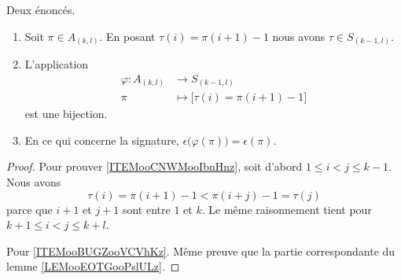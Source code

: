 \begin{lemma}		\label{LEMooCKJAooBIAyVs}
	Deux énoncés.
	\begin{enumerate}
		\item		\label{ITEMooCNWMooIbnHnz}
		      Soit \( \pi\in A_{(k,l)}\). En posant \( \tau(i)=\pi(i+1)-1\) nous avons \( \tau\in S_{(k-1,l)}\).
		\item		\label{ITEMooKNKRooWbLYrF}
		      L'application
		      \begin{equation}
			      \begin{aligned}
				      \varphi\colon A_{(k,l)} & \to S_{(k-1,l)}                          \\
				      \pi                     & \mapsto \Big[  \tau(i)=\pi(i+1)-1  \Big]
			      \end{aligned}
		      \end{equation}
		      est une bijection.
		\item
		      En ce qui concerne la signature, \( \epsilon\big( \varphi(\pi) \big)=\epsilon(\pi)\).
	\end{enumerate}
\end{lemma}

\begin{proof}
	Pour prouver \ref{ITEMooCNWMooIbnHnz}, soit d'abord \( 1\leq i<j\leq k-1\). Nous avons
	\begin{equation}
		\tau(i)=\pi(i+1)-1<\pi(i+j)-1=\tau(j)
	\end{equation}
	parce que \( i+1\) et \( j+1\) sont entre \( 1\) et \( k\). Le même raisonnement tient pour \( k+1\leq i<j\leq k+l\).

	Pour \ref{ITEMooBUGZooVCVhKz}. Même preuve que la partie correspondante du lemme \ref{LEMooEOTGooPslULz}.
\end{proof}
